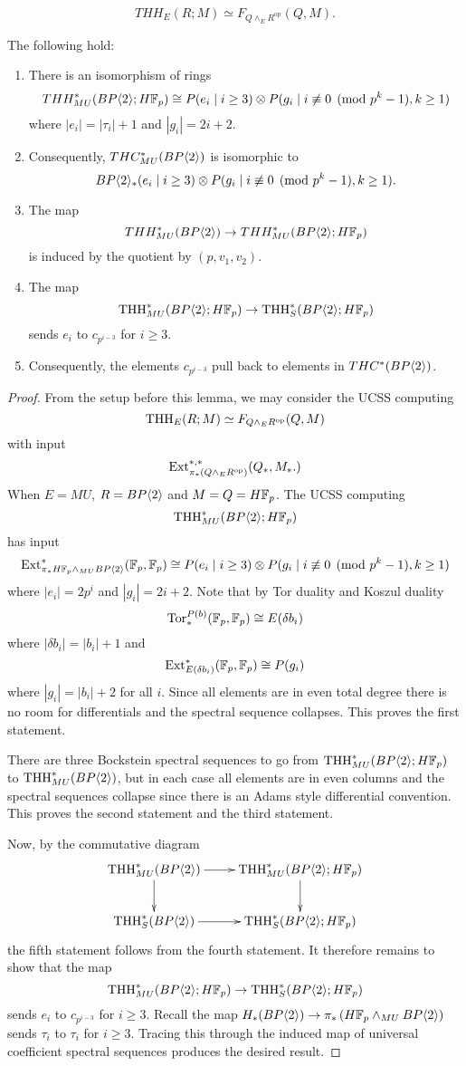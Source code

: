 \[ THH_E(R;M)\simeq F_{Q\wedge_E R^{\text{op}}} (Q,M). \]
\begin{lem} The following hold:
\begin{enumerate}
\item There is an isomorphism of rings 
\[ THH_{MU}^*(BP\langle 2 \rangle;H\mathbb{F}_p)\cong P(e_i \mid i\ge 3 )\otimes P(g_i \mid i\not \equiv 0 \pmod{p^k-1}, k\ge 1)\]
where $|e_i|=|\tau_i|+1$ and $|g_i|=2i+2$.
\item Consequently, $THC_{MU}^*(BP\langle 2 \rangle)$ is isomorphic to 
\[ BP\langle 2 \rangle_*(e_i \mid i\ge 3 )\otimes P(g_i \mid i\not \equiv 0 \pmod{p^k-1}, k\ge 1).\]
\item The map 
\[ THH_{MU}^*(BP\langle 2 \rangle) \to THH_{MU}^*(BP\langle 2 \rangle;H\mathbb{F}_p)\]
is induced by the quotient by $(p,v_1,v_2)$. 
\item The map 
\[ \operatorname{THH}_{MU}^*(BP\langle 2 \rangle;H\mathbb{F}_p) \to \operatorname{THH}_S^*(BP\langle 2 \rangle;H\mathbb{F}_p) \]
sends $e_i$ to $c_{p^{i-3}}$ for $i\ge 3$. 
\item Consequently, the elements 
$c_{p^{i-3}}$ pull back to elements in $THC^*(BP\langle 2 \rangle)$.
\end{enumerate}
\end{lem}
\begin{proof}
From the setup before this lemma, we may consider the UCSS computing 
\[ \operatorname{THH}_E(R;M)\simeq F_{Q\wedge_E R^{\text{op}}} (Q,M)\]
with input 
\[ \operatorname{Ext}_{\pi_*(Q\wedge_E R^{\text{op}})}^{*,*}(Q_*,M_*. )\]
When $E=MU$, $R=BP\langle 2 \rangle$ and $M=Q=H\mathbb{F}_p$. The UCSS computing 
\[\operatorname{THH}_{MU}^*(BP\langle 2 \rangle;H\mathbb{F}_p)\]
has input 
\[ \operatorname{Ext}_{\pi_*H\mathbb{F}_p\wedge_{MU}BP\langle 2 \rangle }^* (\mathbb{F}_p, \mathbb{F}_p)\cong P(e_i \mid i\ge 3 )\otimes P(g_i \mid i\not \equiv 0 \pmod{p^k-1}, k\ge 1) \]
where $|e_i|=2p^i$ and $|g_i|=2i+2$.
Note that by Tor duality and Koszul duality 
\[\operatorname{Tor}_*^{P(b)}(\mathbb{F}_p,\mathbb{F}_p)\cong E(\delta b_i)\] 
where $|\delta b_i|=|b_i|+1$ and 
\[\operatorname{Ext}^*_{E(\delta b_i)}(\mathbb{F}_p,\mathbb{F}_p)\cong P(g_i)\] where $|g_i|=|b_i|+2$ for all $i$. Since all elements are in even total degree there is no room for differentials and the spectral sequence  collapses. This proves the first statement. 

There are three Bockstein spectral sequences to go from $\operatorname{THH}_{MU}^*(BP\langle 2 \rangle;H\mathbb{F}_p)$ to $\operatorname{THH}_{MU}^*(BP\langle 2 \rangle)$, but in each case all elements are in even columns and the spectral sequences collapse since there is an Adams style differential convention. This proves the second statement and the third statement. 

Now, by the commutative diagram
\[
\xymatrix{
\THH^*_{MU}(\B) \ar[r] \ar[d]& \THH^*_{MU}(\B; H\F_p) \ar[d]  \\
\THH_S^*(\B) \ar[r] & \THH_S^*(\B; H\F_p) }
\]
the fifth statement follows from the fourth statement. It therefore remains to show that the map 
\[ \operatorname{THH}_{MU}^*(BP\langle 2 \rangle;H\mathbb{F}_p) \to \operatorname{THH}_S^*(BP\langle 2 \rangle;H\mathbb{F}_p) \]
sends $e_i$ to $c_{p^{i-3}}$ for $i\ge 3$. Recall the map  $H_*(BP\langle 2 \rangle) \to \pi_*\left ( H\mathbb{F}_p\wedge_{MU}BP\langle 2 \rangle \right )$ sends $\tau_i$ to $\tau_i$ for $i\ge  3$. Tracing this through the induced map of universal coefficient spectral sequences produces the desired result. 
\end{proof}
